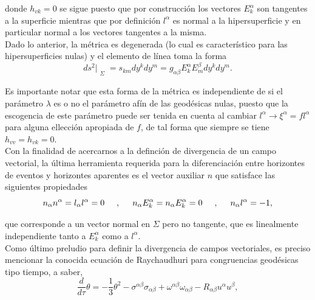 \documentclass[16pt,a4paper]{article}
\numberwithin{equation}{section}
\theoremstyle{definition}
\begin{document}
donde $h_{vk} = 0$ se sigue puesto que por construcción los vectores $E^{\alpha}_{k}$ son tangentes a la superficie mientras que por definición $l^\alpha$ es normal a la hipersuperficie y en particular normal a los vectores tangentes a la misma. \\

Dado lo anterior, la métrica es degenerada (lo cual es característico para las hipersuperficies nulas) y el elemento de línea toma la forma
\begin{equation*}
ds^2|_{\substack{\Sigma}} = s_{km}dy^k dy^m = g_{\alpha \beta} E^{\alpha}_{k} E^{\beta}_{m} dy^k dy^m.
\end{equation*}

Es importante notar que esta forma de la métrica es independiente de si el parámetro $\lambda$ es o no el parámetro afín de las geodésicas nulas, puesto que la escogencia de este parámetro puede ser tenida en cuenta al cambiar $l^\alpha \to \xi^\alpha = fl^\alpha$ para alguna ellección apropiada de $f$, de tal forma que siempre se tiene $h_{vv} = h_{vk} = 0$.\\

Con la finalidad de acercarnos a la definción de divergencia de un campo vectorial, la última herramienta requerida para la diferenciación entre horizontes de eventos y horizontes aparentes es el vector auxiliar $n$ que satisface las siguientes propiedades
\begin{equation}
\label{prop div}
n_\alpha n^\alpha = l_\alpha l^\alpha = 0 \hspace{.5cm},\hspace{.5cm} n_\alpha E^{\alpha}_{k} =  n_\alpha E^{\alpha}_{k} = 0 \hspace{.5cm},\hspace{.5cm} n_\alpha l^\alpha = -1,
\end{equation}

que corresponde a un vector normal en $\Sigma$ pero no tangente, que es linealmente independiente tanto a $E^{\alpha}_{k}$ como a $l^\alpha$.\\

Como último preludio para definir la divergencia de campos vectoriales, es preciso mencionar la conocida ecuación de Raychaudhuri para congruencias geodésicas tipo tiempo, a saber,
\begin{equation*}
\frac{d}{d\tau}\theta = -\frac{1}{3}\theta^2 - \sigma^{\alpha \beta}\sigma_{\alpha \beta} + \omega^{\alpha \beta}\omega_{\alpha \beta}-R_{\alpha \beta}u^\alpha u^\beta,
\end{equation*}
\end{document}
